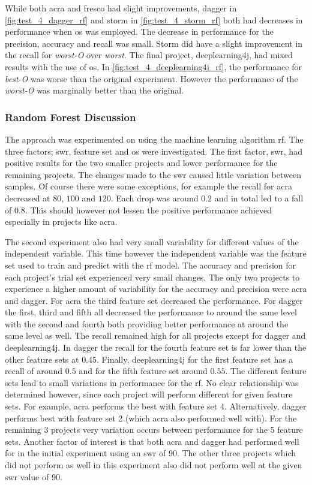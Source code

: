 While both acra and fresco had slight improvements, dagger in \autoref{fig:test_4_dagger_rf} and storm in \autoref{fig:test_4_storm_rf} both had decreases in performance when \gls{os} was employed. The decrease in performance for the precision, accuracy and recall was small. Storm did have a slight improvement in the recall for \textit{worst-O} over \textit{worst}. The final project, deeplearning4j, had mixed results with the use of \gls{os}. In \autoref{fig:test_4_deeplearning4j_rf}, the performance for \textit{best-O} was worse than the original experiment. However the performance of the \textit{worst-O} was marginally better than the original.

\subsubsection{Random Forest Discussion}
\label{subsec:rf_discussion}

The approach was experimented on using the machine learning algorithm \gls{rf}. The three factors; \gls{swr}, feature set and \gls{os} were investigated. The first factor, \gls{swr}, had positive results for the two smaller projects and lower performance for the remaining projects. The changes made to the \gls{swr} caused little variation between samples. Of course there were some exceptions, for example the recall for acra decreased at $80$, $100$ and $120$. Each drop was around $0.2$ and in total led to a fall of $0.8$. This should however not lessen the positive performance achieved especially in projects like acra.

The second experiment also had very small variability for different values of the independent variable. This time however the independent variable was the feature set used to train and predict with the \gls{rf} model. The accuracy and precision for each project's trial set experienced very small changes. The only two projects to experience a higher amount of variability for the accuracy and precision were acra and dagger. For acra the third feature set decreased the performance. For dagger the first, third and fifth all decreased the performance to around the same level with the second and fourth both providing better performance at around the same level as well. The recall remained high for all projects except for dagger and deeplearning4j. In dagger the recall for the fourth feature set is far lower than the other feature sets at $0.45$. Finally, deeplearning4j for the first feature set has a recall of around $0.5$ and for the fifth feature set around $0.55$. The different feature sets lead to small variations in performance for the \gls{rf}. No clear relationship was determined however, since each project will perform different for given feature sets. For example, acra performs the best with feature set 4. Alternatively, dagger performs best with feature set 2 (which acra also performed well with). For the remaining 3 projects very variation occurs between performance for the 5 feature sets. Another factor of interest is that both acra and dagger had performed well for in the initial experiment using an \gls{swr} of 90. The other three projects which did not perform as well in this experiment also did not perform well at the given \gls{swr} value of 90.

